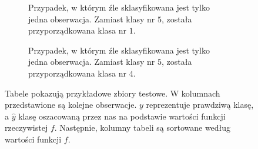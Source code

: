 \documentclass{mini}
\begin{document}
\begin{figure}[!h]
\begin{subfigure}{\textwidth}
\begin{center}
\end{center}
\caption{Przypadek, w którym źle sklasyfikowana jest tylko jedna obserwacja. Zamiast klasy nr $5$, została przyporządkowana klasa nr $1$.\\  }
\label{vus01}
\end{subfigure}
\hspace{1cm}
\begin{subfigure}{\textwidth}
\begin{center}
\end{center}
\caption{Przypadek, w którym źle sklasyfikowana jest tylko jedna obserwacja. Zamiast klasy nr $5$, została przyporządkowana klasa nr $4$.}
\label{vus02}
\end{subfigure}
\caption{Tabele pokazują przykładowe zbiory testowe. W kolumnach przedstawione są kolejne obserwacje. $y$ reprezentuje prawdziwą klasę, a $\hat{y}$ klasę oszacowaną przez nas na podstawie wartości funkcji rzeczywistej $f$. Następnie, kolumny tabeli są sortowane według wartości funkcji $f$.}
\label{vusprzyklad}
\end{figure}
\end{document}
